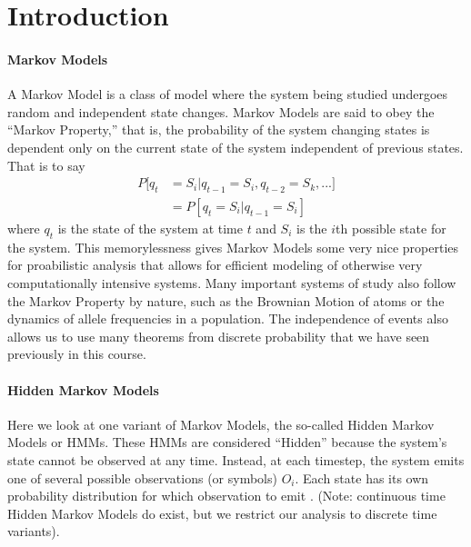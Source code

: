 \section{Introduction} \label{sec:intro}



\paragraph{Markov Models}
A Markov Model is a class of model where the system being studied undergoes random and independent state changes. Markov Models are said to obey the ``Markov Property,'' that is, the probability of the system changing states is dependent only on the current state of the system independent of previous states. That is to say
    \begin{align*}
      P[q_t &= S_i | q_{t-1} = S_i, q_{t-2} = S_k, ...]\\
      &= P[q_t = S_i | q_{t-1} = S_i]
    \end{align*}
where $q_t$ is the state of the system at time $t$ and $S_i$ is the
$i$th possible state for the system. This memorylessness gives Markov
Models some very nice properties for proabilistic analysis that allows
for efficient modeling of otherwise very computationally intensive
systems. Many important systems of study also follow the Markov Property
by nature, such as the Brownian Motion of atoms or the dynamics of
allele frequencies in a population. The independence of events also
allows us to use many theorems from discrete probability that we have
seen previously in this course.

\paragraph{Hidden Markov Models}
Here we look at one variant of Markov Models, the so-called Hidden Markov Models or HMMs. These HMMs are considered ``Hidden'' because the system's state cannot be observed at any time. Instead, at each timestep, the system emits one of several possible observations (or symbols) $O_i$. Each state has its own probability distribution for which observation to emit \cite{Rabiner89}. (Note: continuous time Hidden Markov Models do exist, but we restrict our analysis to discrete time variants).

